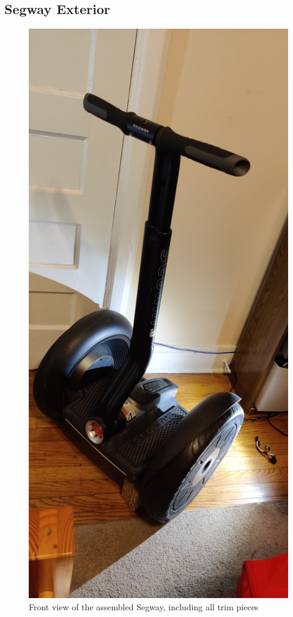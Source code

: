 \documentclass[]{formalLabReport}
\begin{document}
\subsection{Segway Exterior}

\begin{figure}
    \includegraphics[angle=-90]{segwayFront.jpg}
    \caption{Front view of the assembled Segway, including all trim pieces}
    \label{fig:segwayFront.jpg}
\end{figure}
\end{document}
